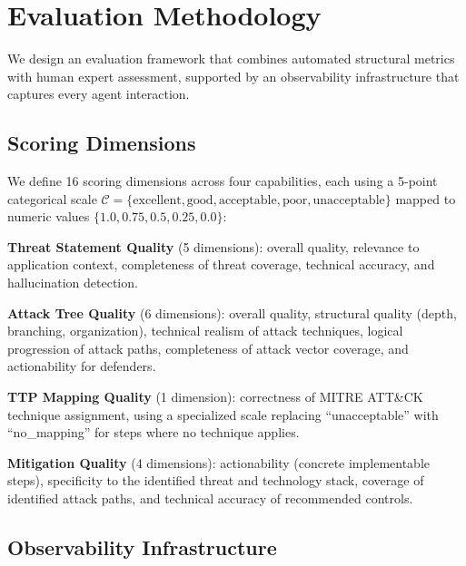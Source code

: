 \section{Evaluation Methodology}
\label{sec:evaluation}

We design an evaluation framework that combines automated structural metrics with human expert assessment, supported by an observability infrastructure that captures every agent interaction.

\subsection{Scoring Dimensions}

We define 16 scoring dimensions across four capabilities, each using a 5-point categorical scale $\mathcal{C} = \{\text{excellent}, \text{good}, \text{acceptable}, \text{poor}, \text{unacceptable}\}$ mapped to numeric values $\{1.0, 0.75, 0.5, 0.25, 0.0\}$:

\textbf{Threat Statement Quality} (5 dimensions): overall quality, relevance to application context, completeness of threat coverage, technical accuracy, and hallucination detection.

\textbf{Attack Tree Quality} (6 dimensions): overall quality, structural quality (depth, branching, organization), technical realism of attack techniques, logical progression of attack paths, completeness of attack vector coverage, and actionability for defenders.

\textbf{TTP Mapping Quality} (1 dimension): correctness of MITRE ATT\&CK technique assignment, using a specialized scale replacing ``unacceptable'' with ``no\_mapping'' for steps where no technique applies.

\textbf{Mitigation Quality} (4 dimensions): actionability (concrete implementable steps), specificity to the identified threat and technology stack, coverage of identified attack paths, and technical accuracy of recommended controls.

\subsection{Observability Infrastructure}

